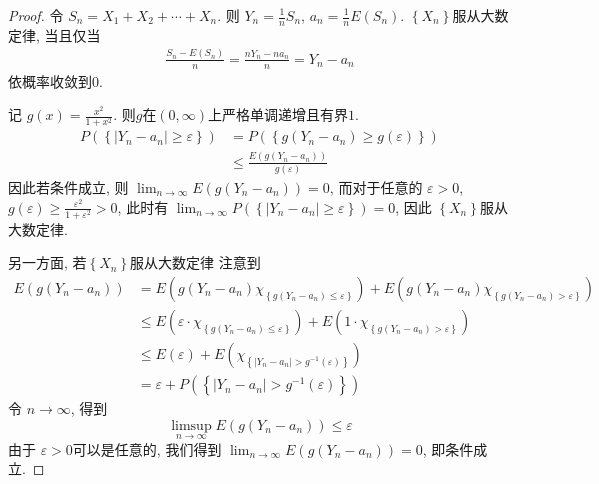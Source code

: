 \documentclass[../main.tex]{subfiles}
\begin{document}
\begin{proof}
令 $S_{n}= X_1+ X_2+ \cdots + X_{n}$. 则 $Y_{n}= \frac{1 }{n }S_{n}$, $a_{n}= \frac{1}{n}E\left(S_{n}\right)$.
$\left\{ X_{n} \right\}$服从大数定律, 当且仅当 
 $$ \begin{aligned} \frac{S_{n}-E\left(S_{n}\right) }{n }= \frac{nY_{n}- na_{n} }{n }= Y_{n}-a_{n} \end{aligned} $$ 
依概率收敛到0. 

记 $g\left(x\right)= \frac{x^{2} }{1+ x^{2} }$. 则$g$在$(0,\infty)$上严格单调递增且有界$1$. 
 $$ \begin{aligned} P\left(\left\{ \left| Y_{n}-a_{n}\right|\ge \varepsilon   \right\}\right)&= P\left(\left\{ g\left(Y_{n}-a_{n}\right)\ge g\left(\varepsilon \right) \right\}\right)\\&\le \frac{E\left(g\left(Y_{n}-a_{n}\right)\right) }{g\left(\varepsilon \right) } \end{aligned} $$ 
因此若条件成立, 则 $\lim_{n\to \infty}E\left(g\left(Y_{n}-a_{n}\right)\right)= 0$, 而对于任意的 $\varepsilon > 0$, $g\left(\varepsilon \right)\ge \frac{\varepsilon ^{2} }{1+ \varepsilon ^{2} }> 0$, 此时有 $\lim_{n\to \infty}P\left(\left\{ \left| Y_{n}-a_{n} \right|\ge \varepsilon   \right\}\right)= 0$, 因此 $\left\{ X_{n} \right\}$服从大数定律.

另一方面, 若$\left\{ X_{n} \right\}$服从大数定律 注意到
 $$ \begin{aligned} E\left(g\left(Y_{n}-a_{n}\right)\right)&=E\left(g\left(Y_{n}-a_{n}\right)\chi _{\left\{ g\left(Y_{n}-a_{n}\right)\le \varepsilon  \right\}}\right)+ E\left(g\left(Y_{n}-a_{n}\right)\chi _{\left\{ g\left(Y_{n}-a_{n}\right)> \varepsilon  \right\}}\right)\\&\le E\left(\varepsilon \cdot \chi _{\left\{ g\left(Y_{n}-a_{n}\right)\le \varepsilon  \right\}}\right)+ E\left(1\cdot \chi _{\left\{ g\left(Y_{n}-a_{n}\right)> \varepsilon \right\}}\right) \\&\le E\left(\varepsilon \right)+ E\left(\chi _{\left\{ \left| Y_{n}-a_{n} \right|>  g^{-1} \left(\varepsilon  \right)  \right\}}\right)\\&=\varepsilon + P\left(\left\{ \left| Y_{n}-a_{n} \right|> g^{-1} \left(\varepsilon   \right)  \right\}\right) \end{aligned}$$ 
令 $n\to \infty$, 得到
 $$ \limsup_{n\to \infty}E\left(g\left(Y_{n}-a_{n}\right)\right)\le \varepsilon  $$ 
由于 $\varepsilon > 0$可以是任意的, 我们得到  $\lim_{n\to \infty}E\left(g\left(Y_{n}-a_{n}\right)\right)= 0$, 即条件成立.
\end{proof}
\end{document}
